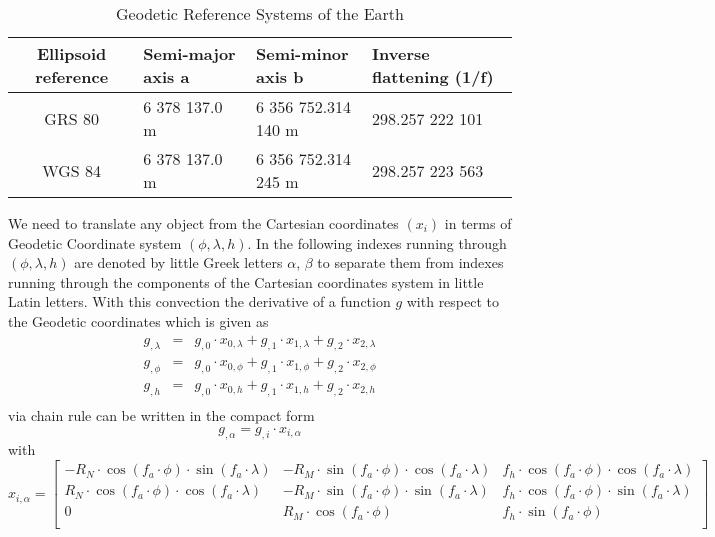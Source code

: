 \begin{table}
\begin{center}
\begin{tabular}{c|lll}
Ellipsoid reference & Semi-major axis a & Semi-minor axis b & Inverse flattening (1/f)\\
\hline
GRS 80 & 6 378 137.0 m & 6 356 752.314 140 m & 298.257 222 101\\
WGS 84 & 6 378 137.0 m & 6 356 752.314 245 m & 298.257 223 563
\end{tabular}
\end{center}
\caption{Geodetic Reference Systems of the Earth}\label{REF:FIG:REF:10}
\end{table}

We need to translate any object from the Cartesian coordinates $(x_i)$ in terms of Geodetic Coordinate system
$(\phi, \lambda, h)$. In the following indexes running through $(\phi, \lambda, h)$ are denoted by little Greek letters $\alpha$, 
$\beta$
to separate them from indexes running through the components of the Cartesian coordinates system in little Latin letters.
With this convection the derivative of a function $g$ with respect to the Geodetic coordinates which is given as
\begin{equation}
\begin{array}{rcl}
  g_{,\lambda} & =  & g_{,0} \cdot x_{0,\lambda} + g_{,1} \cdot x_{1,\lambda} + g_{,2} \cdot x_{2,\lambda} \\  
  g_{,\phi} & =  & g_{,0} \cdot x_{0,\phi} + g_{,1} \cdot x_{1,\phi} + g_{,2} \cdot x_{2,\phi} \\
  g_{,h} & =  & g_{,0} \cdot x_{0,h} + g_{,1} \cdot x_{1,h} + g_{,2} \cdot x_{2,h} \\
\end{array}
\end{equation}
via chain rule can be written in the compact form 
\begin{equation}
  g_{,\alpha}   =    g_{,i} \cdot x_{i,\alpha} 
\end{equation}
with
\begin{equation}
 x_{i,\alpha}
= 
\left[
\begin{array}{ccc}
-  R_N \cdot \cos(f_{a} \cdot  \phi) \cdot  \sin(f_{a} \cdot  \lambda) & - R_M \cdot \sin(f_{a} \cdot  \phi) \cdot  \cos(f_{a} \cdot  \lambda) &  f_{h}  \cdot  \cos(f_{a} \cdot  \phi) \cdot  \cos(f_{a} \cdot  \lambda)  \\
 R_N  \cdot  \cos(f_{a} \cdot  \phi) \cdot  \cos(f_{a} \cdot  \lambda) &   -  R_M \cdot  \sin(f_{a} \cdot  \phi) \cdot  \sin(f_{a} \cdot  \lambda) &   f_{h}  \cdot  \cos(f_{a} \cdot  \phi) \cdot  \sin(f_{a} \cdot  \lambda) \\
 0 &  R_M  \cdot  \cos(f_{a} \cdot  \phi) &    f_{h}  \cdot  \sin(f_{a} \cdot  \phi) \\
\end{array}
\right]
\end{equation}
